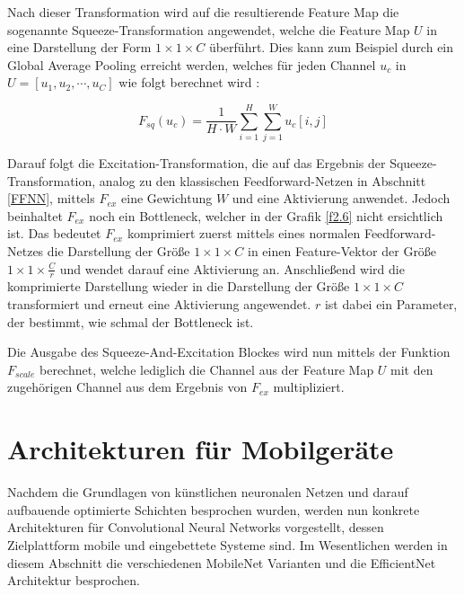 Nach dieser Transformation wird auf die resultierende Feature Map die sogenannte Squeeze-Transformation angewendet, welche die Feature Map $U$ in eine Darstellung der Form $1 \times 1 \times C$ überführt. Dies kann zum Beispiel durch ein Global Average Pooling erreicht werden, welches für jeden Channel $u_c$ in $U = [u_1, u_2, \cdots, u_C]$ wie folgt berechnet wird \cite{hu_squeeze-and-excitation_2019}:

\begin{equation}
F_{sq}(u_c) = \frac{1}{H \cdot W} \sum_{i=1}^{H} \sum_{j=1}^{W} u_c[i, j]
\label{eq2.6}
\end{equation}

Darauf folgt die Excitation-Transformation, die auf das Ergebnis der Squeeze-Trans\-formation, analog zu den klassischen Feedforward-Netzen in Abschnitt \ref{FFNN}, mittels $F_{ex}$ eine Gewichtung $W$ und eine Aktivierung anwendet. Jedoch beinhaltet $F_{ex}$ noch ein Bottleneck, welcher in der Grafik \ref{f2.6} nicht ersichtlich ist. Das bedeutet $F_{ex}$ komprimiert zuerst mittels eines normalen Feedforward-Netzes die Darstellung der Größe $1 \times 1 \times C$ in einen Feature-Vektor der Größe $1 \times 1 \times \frac{C}{r}$ und wendet darauf eine Aktivierung an. Anschließend wird die komprimierte Darstellung wieder in die Darstellung der Größe $1 \times 1 \times C$ transformiert und erneut eine Aktivierung angewendet. $r$ ist dabei ein Parameter, der bestimmt, wie schmal der Bottleneck ist.

Die Ausgabe des Squeeze-And-Excitation Blockes wird nun mittels der Funktion $F_{scale}$ berechnet, welche lediglich die Channel aus der Feature Map $U$ mit den zugehörigen Channel aus dem Ergebnis von $F_{ex}$ multipliziert.



\section{Architekturen für Mobilgeräte}
\label{architekturen}
Nachdem die Grundlagen von künstlichen neuronalen Netzen und darauf aufbauende optimierte Schichten besprochen wurden, werden nun konkrete Architekturen für Convolutional Neural Networks vorgestellt, dessen Zielplattform mobile und eingebettete Systeme sind. Im Wesentlichen werden in diesem Abschnitt die verschiedenen MobileNet Varianten \cite{howard_mobilenets_2017, sandler_mobilenetv2_2019, howard_searching_2019} und die EfficientNet \cite{tan_efficientnet_2020} Architektur besprochen.


